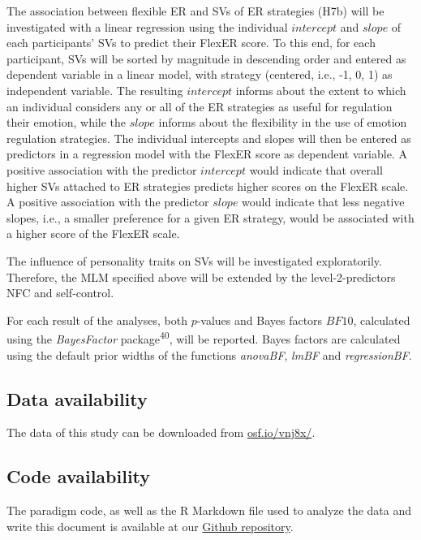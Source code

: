 \documentclass[
  english,
  man,floatsintext]{apa6}
\begin{document}
The association between flexible ER and SVs of ER strategies (H7b) will be investigated with a linear regression using the individual \(intercept\) and \(slope\) of each participants' SVs to predict their FlexER score.
To this end, for each participant, SVs will be sorted by magnitude in descending order and entered as dependent variable in a linear model, with strategy (centered, i.e., -1, 0, 1) as independent variable.
The resulting \(intercept\) informs about the extent to which an individual considers any or all of the ER strategies as useful for regulation their emotion, while the \(slope\) informs about the flexibility in the use of emotion regulation strategies.
The individual intercepts and slopes will then be entered as predictors in a regression model with the FlexER score as dependent variable.
A positive association with the predictor \(intercept\) would indicate that overall higher SVs attached to ER strategies predicts higher scores on the FlexER scale.
A positive association with the predictor \(slope\) would indicate that less negative slopes, i.e., a smaller preference for a given ER strategy, would be associated with a higher score of the FlexER scale.

The influence of personality traits on SVs will be investigated exploratorily.
Therefore, the MLM specified above will be extended by the level-2-predictors NFC and self-control.

For each result of the analyses, both \(p\)-values and Bayes factors \(BF10\), calculated using the \emph{BayesFactor} package\textsuperscript{40}, will be reported.
Bayes factors are calculated using the default prior widths of the functions \emph{anovaBF}, \emph{lmBF} and \emph{regressionBF}.

\hypertarget{data-availability}{%
\subsection{Data availability}\label{data-availability}}

The data of this study can be downloaded from \href{https://osf.io/vnj8x/}{osf.io/vnj8x/}.

\hypertarget{code-availability}{%
\subsection{Code availability}\label{code-availability}}

The paradigm code, as well as the R Markdown file used to analyze the data and write this document is available at our \href{https://github.com/ChScheffel/CERED}{Github repository}.
\end{document}
